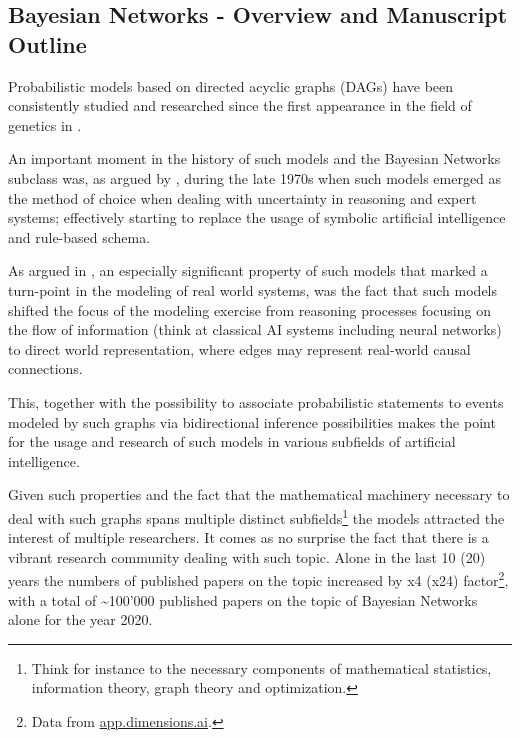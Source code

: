 \documentclass[11pt]{article}
\begin{document}
\begin{article}

\maketitle

\newpage

\tableofcontents
\listoffigures
\listofalgorithms
\listoftables

\newpage

\section{Bayesian Networks - Overview and Manuscript Outline}
\label{sec:org00ea27a}


Probabilistic models based on directed acyclic graphs (DAGs) have
been consistently studied and researched since the first appearance
in the field of genetics in \cite{wright1921correlation}.

An important moment in the history of such models and the Bayesian
Networks subclass was, as argued by \cite{pearl2011bayesian}, during
the late 1970s when such models emerged as the method of choice when
dealing with uncertainty in reasoning and expert systems;
effectively starting to replace the usage of symbolic artificial
intelligence and rule-based schema.

As argued in \cite{pearl2011bayesian}, an especially significant
property of such models that marked a turn-point in the modeling of
real world systems, was the fact that such models shifted the focus
of the modeling exercise from reasoning processes focusing on the
flow of information (think at classical AI systems including neural
networks) to direct world representation, where edges may represent
real-world causal connections.

This, together with the possibility to associate probabilistic
statements to events modeled by such graphs via bidirectional
inference possibilities makes the point for the usage and research
of such models in various subfields of artificial intelligence.

Given such properties and the fact that the mathematical machinery
necessary to deal with such graphs spans multiple distinct
subfields\footnote{Think for instance to the necessary components of mathematical
statistics, information theory, graph theory and optimization.} the models attracted the interest of multiple
researchers. It comes as no surprise the fact that there is a
vibrant research community dealing with such topic. Alone in the
last 10 (20) years the numbers of published papers on the topic
increased by x4 (x24) factor\footnote{Data from \href{https://app.dimensions.ai/discover/publication}{app.dimensions.ai}.}, with a total of \textasciitilde{}100'000
published papers on the topic of Bayesian Networks alone for the
year 2020.


\end{article}
\end{document}
